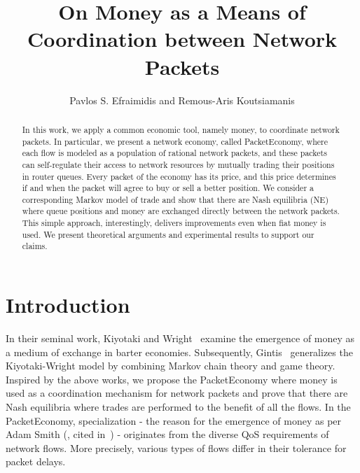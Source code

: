 \documentclass[letterpaper,10pt]{llncs}
\newcommand{\hla}[1]{\hl{#1}}
\renewcommand{\hla}[1]{#1}
\begin{document}
\title{On Money as a Means of Coordination between Network Packets}
\author{Pavlos S. Efraimidis and Remous-Aris Koutsiamanis}

\maketitle

\begin{abstract}
In this work, we apply a common economic tool, namely money,
to coordinate network packets. In particular, we present a network economy, called PacketEconomy,
where each flow is modeled as a population of rational network packets, and these packets can self-regulate their access to network resources by mutually trading their positions in router queues. 
\hla{Every packet of the economy has its price, and this price determines if and when the packet will agree to buy or sell a better position.} We consider a corresponding Markov model of trade and show that there are Nash equilibria (NE) where queue positions and money are exchanged directly between
the network packets. This simple approach, interestingly, delivers improvements even when fiat money is used. We present theoretical arguments and experimental results to support our claims. 
\end{abstract}

\section{Introduction}
In their seminal work, Kiyotaki and Wright~\cite{KW89} examine the emergence of money as
a medium of exchange in barter economies. Subsequently, Gintis~\cite{Gi97,Gi00} generalizes
the Kiyotaki-Wright model by combining Markov chain theory and game theory.
Inspired by the above works, we propose the PacketEconomy where money is used 
as a coordination mechanism for network packets and prove that there are Nash equilibria where trades are 
performed to the benefit of all the flows.
In the PacketEconomy, specialization - the reason for the emergence of money as per Adam Smith (\cite[Chapter 4]{Sm1776}, cited in~\cite{KW89}) - 
originates from the diverse QoS requirements of
network flows. More precisely, various types of flows differ in their
tolerance for packet delays.
\end{document}
